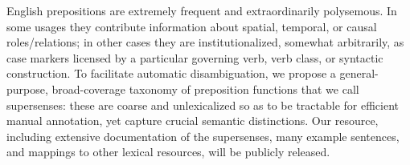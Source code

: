 English prepositions are extremely frequent and extraordinarily polysemous. In some usages they contribute information about spatial, temporal, or causal roles/relations; in other cases they are institutionalized, somewhat arbitrarily, as case markers licensed by a particular governing verb, verb class, or syntactic construction. To facilitate automatic disambiguation, we propose a general-purpose, broad-coverage taxonomy of preposition functions that we call supersenses: these are coarse and unlexicalized so as to be tractable for efficient manual annotation, yet capture crucial semantic distinctions. Our resource, including extensive documentation of the supersenses, many example sentences, and mappings to other lexical resources, will be publicly released.
